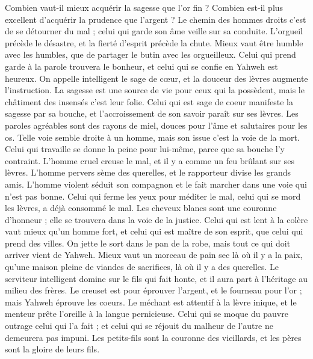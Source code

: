 \begin{multicols}{2}
Combien vaut-il mieux acquérir la sagesse que l'or fin ? Combien est-il plus excellent d'acquérir la prudence que l'argent ?
Le chemin des hommes droits c'est de se détourner du mal ; celui qui garde son âme veille sur sa conduite.
L'orgueil précède le désastre, et la fierté d'esprit précède la chute.
Mieux vaut être humble avec les humbles, que de partager le butin avec les orgueilleux.
Celui qui prend garde à la parole trouvera le bonheur, et celui qui se confie en Yahweh est heureux.
On appelle intelligent le sage de cœur, et la douceur des lèvres augmente l'instruction.
La sagesse est une source de vie pour ceux qui la possèdent, mais le châtiment des insensés c'est leur folie.
Celui qui est sage de coeur manifeste la sagesse par sa bouche, et l'accroissement de son savoir paraît sur ses lèvres.
Les paroles agréables sont des rayons de miel, douces pour l'âme et salutaires pour les os.
Telle voie semble droite à un homme, mais son issue c'est la voie de la mort.
Celui qui travaille se donne la peine pour lui-même, parce que sa bouche l'y contraint.
L'homme cruel creuse le mal, et il y a comme un feu brûlant sur ses lèvres.
L'homme pervers sème des querelles, et le rapporteur divise les grands amis.
L'homme violent séduit son compagnon et le fait marcher dans une voie qui n'est pas bonne.
Celui qui ferme les yeux pour méditer le mal, celui qui se mord les lèvres, a déjà consommé le mal.
Les cheveux blancs sont une couronne d'honneur ; elle se trouvera dans la voie de la justice.
Celui qui est lent à la colère vaut mieux qu'un homme fort, et celui qui est maître de son esprit, que celui qui prend des villes.
On jette le sort dans le pan de la robe, mais tout ce qui doit arriver vient de Yahweh.
\VerseOne{}Mieux vaut un morceau de pain sec là où il y a la paix, qu'une maison pleine de viandes de sacrifices, là où il y a des querelles.
Le serviteur intelligent domine sur le fils qui fait honte, et il aura part à l'héritage au milieu des frères.
Le creuset est pour éprouver l'argent, et le fourneau pour l'or ; mais Yahweh éprouve les coeurs.
Le méchant est attentif à la lèvre inique, et le menteur prête l'oreille à la langue pernicieuse.
Celui qui se moque du pauvre outrage celui qui l'a fait ; et celui qui se réjouit du malheur de l'autre ne demeurera pas impuni.
Les petits-fils sont la couronne des vieillards, et les pères sont la gloire de leurs fils.

\end{multicols}
